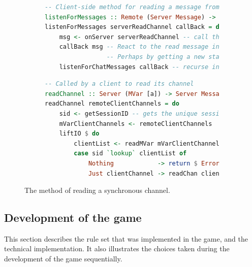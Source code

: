 \documentclass[a4paper]{article}
\begin{document}
\begin{figure}[h!]

\begin{subfigure}[]{\textwidth}
\begin{lstlisting}[language=Haskell]
-- Client-side method for reading a message from the server
listenForMessages :: Remote (Server Message) -> (Message -> Client ()) -> Client ()
listenForMessages serverReadChannel callBack = do
    msg <- onServer serverReadChannel -- call the server with the readChannel method
    callBack msg -- React to the read message in some way
                 -- Perhaps by getting a new state
    listenForChatMessages callBack -- recurse indefinitely
\end{lstlisting}
\end{subfigure}

\begin{subfigure}[]{\textwidth}
\begin{lstlisting}[language=Haskell]
-- Called by a client to read its channel
readChannel :: Server (MVar [a]) -> Server Message
readChannel remoteClientChannels = do
    sid <- getSessionID -- gets the unique session id
    mVarClientChannels <- remoteClientChannels
    liftIO $ do
        clientList <- readMVar mVarClientChannels
        case sid `lookup` clientList of
            Nothing            -> return $ ErrorMessage "Couldn't find client."
            Just clientChannel -> readChan clientChannel -- readChan is a blocking action
\end{lstlisting}
\end{subfigure}

\caption{The method of reading a synchronous channel.}
\label{fig:reading-channel}
\end{figure}


\subsection{Development of the game}
\label{sec:game-development}
This section describes the rule set that was implemented in the game, and the technical implementation. It also illustrates the choices taken during the development of the game sequentially.
\end{document}

